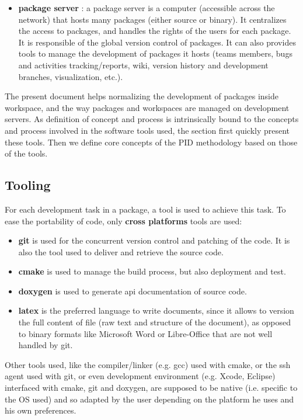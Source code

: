 \documentclass[12pt,a4paper]{article}
\begin{document}
\begin{itemize}
\item \textbf{package server} : a package server is a computer (accessible across the network) that hosts many packages (either source or binary). It centralizes the access to packages, and handles the rights of the users for each package. It is responsible of the global version control of packages. It can also provides tools to manage the development of packages it hosts (teams members, bugs and activities tracking/reports, wiki, version history and development branches, visualization, etc.).
\end{itemize}
 
The present document helps normalizing the development of packages inside workspace, and the way packages and workspaces are managed on development servers. As definition of concept and process is intrinsically bound to the concepts and process involved in the software tools used, the section first quickly present these tools. Then we define core concepts of the PID methodology based on those of the tools.
 
\subsection{Tooling}

For each development task in a package, a tool is used to achieve this task. To ease the portability of code, only \textbf{cross platforms} tools are used:
\begin{itemize}
\item \textbf{git} is used for the concurrent version control and patching of the code. It is also the tool used to deliver and retrieve the source code.
\item \textbf{cmake} is used to manage the build process, but also deployment and test.
\item \textbf{doxygen} is used to generate api documentation of source code.
\item \textbf{latex} is the preferred language to write documents, since it allows to version the full content of file (raw text and structure of the document), as opposed to binary formats like Microsoft Word or Libre-Office that are not well handled by git.
\end{itemize}

Other tools used, like the compiler/linker (e.g. gcc) used with cmake, or the ssh agent used with git, or even development environment (e.g. Xcode, Eclipse) interfaced with cmake, git and doxygen, are supposed to be native (i.e. specific to the OS used) and so adapted by the user depending on the platform he uses and his own preferences.
\end{document}

